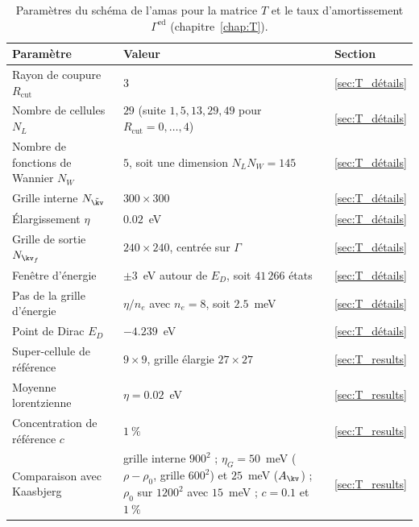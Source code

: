 \begin{table}[htbp]
    \centering
    \caption[Paramètres de la matrice $T$ et du taux d'amortissement $\Gamma^\text{ed}$.]{Paramètres du schéma de l'amas pour la matrice $T$ et le taux d'amortissement $\Gamma^\text{ed}$ (chapitre~\ref{chap:T}).}
    \label{tab:param_T}
    \small
    \setlength{\tabcolsep}{4pt}
    \begin{tabular}{p{} p{} p{}}
        \hline\hline
        Paramètre & Valeur & Section \\
        \hline
        Rayon de coupure $R_\text{cut}$ & $3$ & \ref{sec:T_détails} \\
        Nombre de cellules $N_L$ & $29$ (suite $1, 5, 13, 29, 49$ pour $R_\text{cut} = 0, \dots, 4$) & \ref{sec:T_détails} \\
        Nombre de fonctions de Wannier $N_W$ & $5$, soit une dimension $N_LN_W = 145$ & \ref{sec:T_détails} \\
        Grille interne $N_{\tilde\kv}$ & $300\times 300$ & \ref{sec:T_détails} \\
        Élargissement $\eta$ & $0.02$~eV & \ref{sec:T_détails} \\
        Grille de sortie $N_{\kv_f}$ & $240\times 240$, centrée sur $\Gamma$ & \ref{sec:T_détails} \\
        Fenêtre d'énergie & $\pm 3$~eV autour de $E_D$, soit $41\,266$ états & \ref{sec:T_détails} \\
        Pas de la grille d'énergie & $\eta/n_e$ avec $n_e = 8$, soit $2.5$~meV & \ref{sec:T_détails} \\
        Point de Dirac $E_D$ & $-4.239$~eV & \ref{sec:T_détails} \\
        Super-cellule de référence & $9\times 9$, grille élargie $27\times 27$ & \ref{sec:T_results} \\
        Moyenne lorentzienne & $\eta = 0.02$~eV & \ref{sec:T_results} \\
        Concentration de référence $c$ & $1~\%$ & \ref{sec:T_results} \\
        Comparaison avec Kaasbjerg & grille interne $900^2$ ; $\eta_G = 50$~meV ($\rho - \rho_0$, grille $600^2$) et $25$~meV ($A_\kv$) ; $\rho_0$ sur $1200^2$ avec $15$~meV ; $c = 0.1$ et $1~\%$ & \ref{sec:T_results} \\
        \hline\hline
    \end{tabular}
\end{table}

